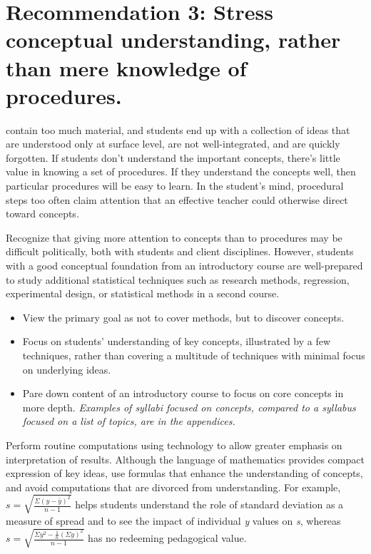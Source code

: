 \section{\textbf{Recommendation 3: Stress conceptual understanding, rather than mere knowledge of procedures.}}
 
 contain too much material, and students end up with a collection of ideas that are understood only at surface level, are not well-integrated, and are quickly forgotten. If students don't understand the important concepts, there's little value in knowing a set of procedures. If they understand the concepts well, then particular procedures will be easy to learn. In the student's mind, procedural steps too often claim attention that an effective teacher could otherwise direct toward concepts.
 
Recognize that giving more attention to concepts than to procedures may be difficult politically, both with students and client disciplines. However, students with a good conceptual foundation from an introductory course are well-prepared to study additional statistical techniques such as research methods, regression, experimental design, or statistical methods in a second course.
 
 \vspace{.2in}
\noindent {}
\begin{itemize}[leftmargin=1cm, itemsep=.2em]
\item View the primary goal as not to cover methods, but to discover concepts.
\item Focus on students' understanding of key concepts, illustrated by a few techniques, rather than covering a multitude of techniques with minimal focus on underlying ideas.
\item Pare down content of an introductory course to focus on core concepts in more depth.  \textit{Examples of syllabi focused on concepts, compared to a syllabus focused on a list of topics, are in the appendices.}
\end{itemize}
 
Perform routine computations using technology to allow greater emphasis on interpretation of results. Although the language of mathematics provides compact expression of key ideas, use formulas that enhance the understanding of concepts, and avoid computations that are divorced from understanding.  For example, $s=\sqrt{\frac{\Sigma(y-\bar{y})^2}{n-1}}$ helps students understand the role of standard deviation as a measure of spread and to see the impact of individual \textit{y} values on \textit{s}, whereas $s=\sqrt{\frac{\Sigma y^2 - \frac{1}{n}\left(\Sigma y\right)^2}{n-1}}$ has no redeeming pedagogical value.

